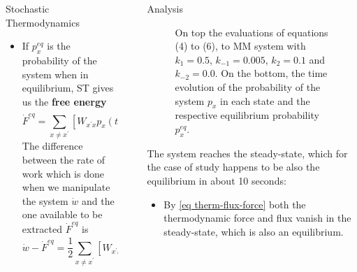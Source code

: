 \documentclass[final]{beamer}
\newlength{\sepwidth}
\newlength{\colwidth}
\newcommand{\separatorcolumn}{\begin{column}{\sepwidth}\end{column}}
\begin{document}
\begin{frame}[t]
\begin{columns}[t]
\begin{column}{\colwidth}
\begin{block}{Stochastic Thermodynamics}
\begin{itemize}
\item If $p_x^{eq}$ is the probability of the system when in equilibrium, ST gives us the {\bf free energy}
%
\begin{equation}
\dot{F}^{eq}= \sum_{x \neq x^\prime} \left[ W_{x^\prime x} p_x(t) -  W_{x x^\prime}p_{x^\prime} \right] \ln \frac{p_x(t)}{p_{x^\prime}^{eq}} = \dot{w} - k_BT \dot{S}^{tot}.
\end{equation}
The difference between  the rate of work which is done when we manipulate the system $\dot{w}$ and the one available to be extracted $\dot{F}^{eq}$ is
\begin{equation}
\dot{w} - \dot{F}^{eq}= \frac{1}{2} \sum_{x \neq x^\prime} \left[ W_{x^\prime x} p_x(t) - W_{x x^\prime}p_{x^\prime} \right] \ln \frac{W_{x^\prime x} p_x^{eq}}{W_{xx^\prime}p_{x^\prime}^{eq}}.
\end{equation}
\end{itemize}
\end{block}

\end{column}

\separatorcolumn

\begin{column}{\colwidth}

\begin{block}{Analysis}
\begin{figure}
\begin{center}

\end{center}
\label{fig 2-state-system}
\caption{On top the evaluations of equations (4) to (6), to MM system with $k_{1} = 0.5$, $k_{-1} = 0.005$, $k_{2} = 0.1$ and $k_{-2} = 0.0$. On the bottom, the time evolution of the probability of the system $p_{x}$ in each state and the respective equilibrium probability $p_{x}^{eq}$.}
\end{figure}

The system reaches the steady-state, which for the case of study happens to be also the equilibrium in about 10 seconds:
%
\begin{itemize}
\item By \eqref{eq therm-flux-force} both the thermodynamic force and flux vanish in the steady-state, which is also an equilibrium.


\end{itemize}
\end{block}
\end{column}
\end{columns}
\end{frame}
\end{document}
